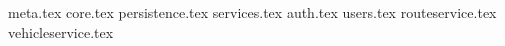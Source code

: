 {meta.tex}
{core.tex}
{persistence.tex}
{services.tex}
{auth.tex}
{users.tex}
{routeservice.tex}
{vehicleservice.tex}
